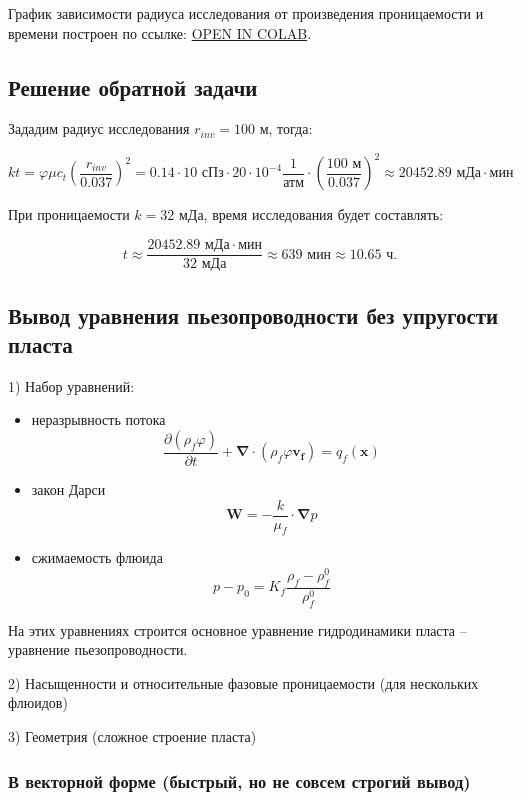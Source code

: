 \documentclass[a4paper,12pt]{article}
\newcommand{\beq}{\begin{equation}}
\newcommand{\eeq}{\end{equation}}
\begin{document}
График зависимости радиуса исследования от произведения проницаемости и времени построен по ссылке: \href{https://colab.research.google.com/github/mualal/notebooks-source/blob/master/7_exploration_radius.ipynb}{OPEN IN COLAB}.

\subsection{Решение обратной задачи}

Зададим радиус исследования $r_{inv}=100\text{ м}$, тогда:

\beq
kt=\varphi\mu c_t\left(\dfrac{r_{inv}}{0.037}\right)^2=0.14\cdot 10\text{ сПз}\cdot 20\cdot 10^{-4}\frac{1}{\text{атм}}\cdot \left(\frac{100\text{ м}}{0.037}\right)^{\!2}\approx 20452.89\text{ мДа}\cdot\text{мин}
\eeq

При проницаемости $k=32\text{ мДа}$, время исследования будет составлять:

\beq
t\approx\frac{20452.89\text{ мДа}\cdot\text{мин}}{32\text{ мДа}}\approx 639 \text{ мин}\approx10.65\text{ ч}.
\eeq

\subsection{Вывод уравнения пьезопроводности без упругости пласта}

1) Набор уравнений:
\begin{itemize}
	\item неразрывность потока
	\beq\label{Continuity}
	\frac{\partial\left(\rho_f\varphi\right)}{\partial t}+\pmb{\nabla}\cdot\left(\rho_f\varphi \pmb{v_f}\right)=q_f(\pmb{x})
	\eeq
	\item закон Дарси
	\beq\label{Darcy}
	\pmb{W}=-\frac{k}{\mu_f}\cdot\pmb{\nabla} p
	\eeq
	\item сжимаемость флюида
	\beq\label{Compressibility}
	p-p_0=K_f\frac{\rho_f-\rho_f^0}{\rho_f^0}
	\eeq
\end{itemize}

На этих уравнениях строится основное уравнение гидродинамики пласта -- уравнение пьезопроводности.

2) Насыщенности и относительные фазовые проницаемости (для нескольких флюидов)

3) Геометрия (сложное строение пласта)

\subsubsection{В векторной форме (быстрый, но не совсем строгий вывод)}
\end{document}
